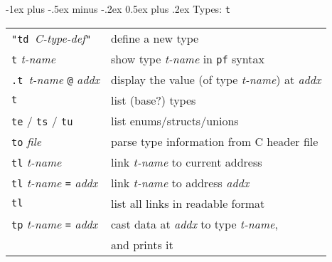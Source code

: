 \documentclass[a4paper,landscape]{article}
\makeatletter
\renewcommand{\section}{\@startsection{section}{1}{0mm}%
                                {-1ex plus -.5ex minus -.2ex}%
                                {0.5ex plus .2ex}%
                                {\normalfont\large\bfseries}}
\makeatother
\begin{document}
\begin{multicols*}{3}
\section{Types: \texttt{t}}
\begin{tabular}{@{}ll@{}}
\texttt{"td\ }\textit{C-type-def}\texttt{"} & define a new type \\
\texttt{t} \textit{t-name} & show type \textit{t-name} in \texttt{pf} syntax \\
\texttt{.t }\textit{t-name} \texttt{@} \textit{addx} & display the value (of type \textit{t-name}) at \textit{addx} \\
\texttt{t} & list (base?) types \\
\texttt{te} / \texttt{ts} / \texttt{tu} & list enums/structs/unions \\
\texttt{to} \textit{file} & parse type information from C header file \\
\texttt{tl} \textit{t-name} & link \textit{t-name} to current address \\
\texttt{tl} \textit{t-name} \texttt{=} \textit{addx} & link \textit{t-name} to address \textit{addx} \\
\texttt{tl} & list all links in readable format \\
\texttt{tp} \textit{t-name} \texttt{=} \textit{addx} & cast data at \textit{addx} to type \textit{t-name}, \\ & and prints it \\
\end{tabular}


\end{multicols*}
\end{document}
